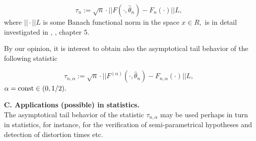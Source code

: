 $$
\tau_n := \sqrt{n} \cdot || F(\cdot, \hat{\theta}_n ) - F_n(\cdot) ||L,
$$
where $  || \cdot||L  $ is some Banach functional norm in the space $ x \in R, $ is in detail investigated in \cite{Piterbarg1},
\cite{Piterbarg2}, chapter 5.\par
  By our opinion, it is interest to obtain also the asymptotical  tail behavior of the following statistic

$$
\tau_{n,\alpha} := \sqrt{n} \cdot || F^{(\alpha)}(\cdot, \hat{\theta}_n ) - F_{n,\alpha}(\cdot) ||L,
$$
$  \alpha = \mathop{\rm const}\limits \in (0, 1/2). $\par

\vspace{3mm}

{\bf C. Applications (possible) in  statistics.}\\

 The asymptotical  tail behavior of the  statistic $ \tau_{n,\alpha} $ may be used perhaps  in turn in statistics,
for instance, for the verification of semi-parametrical hypotheses and detection of distortion times etc. \par

 \vspace{4mm}

